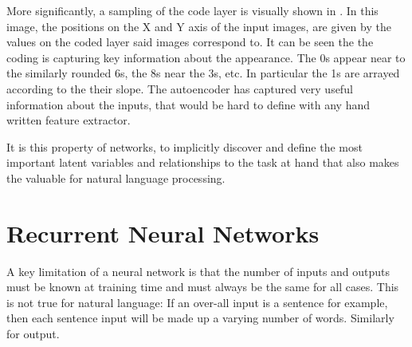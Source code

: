 \documentclass[12pt,parskip]{komatufte}
\begin{document}


More significantly, a sampling of the code layer is visually shown in .
In this image, the positions on the X and Y axis of the input images, are given by the values on the coded layer said images correspond to.
It can be seen the the coding is capturing key information about the appearance.
The 0s appear near to the similarly rounded 6s,
the 8s near the 3s, etc.
In particular the 1s are arrayed according to the their slope.
The autoencoder has captured very useful information about the inputs, that would be hard to define with any hand written feature extractor.

It is this property of networks, to implicitly discover and define the most important latent variables and relationships to the task at hand that also makes the valuable for natural language processing.





\section{Recurrent Neural Networks}

A key limitation of a neural network is that the number of inputs and outputs must be known at training time and must always be the same for all cases.
This is not true for natural language: If an over-all input is a sentence for example, then each sentence input will be made up a varying number of words. Similarly for output.
\end{document}
